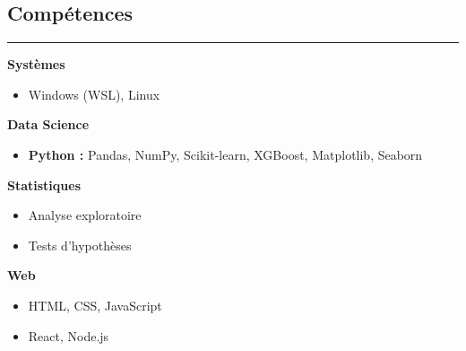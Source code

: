 \documentclass[a4paper,12pt]{article}
\newcommand{\sectionrule}[1]{%
\section*{#1}%
\vspace{-1em}%
\noindent\rule{\linewidth}{1pt}%
\vspace{0.5em}%
}
\begin{document}
\begin{paracol}{2}
\begin{rightcolumn}
\begin{minipage}[t][\dimexpr\textheight - 9em\relax][t]{\dimexpr\linewidth - 1.5em\relax}
{  \vspace{0.5em}

\sectionrule{Compétences}
\vspace{-3em}
\setlength{\columnsep}{2em}
\begin{multicols}{2}

\textbf{Systèmes}
\begin{itemize}[leftmargin=1.2em, nosep]
  \item Windows (WSL), Linux
\end{itemize}
\vspace{1em}
\textbf{Data Science}
\begin{itemize}[leftmargin=1.2em, nosep]
  \item \textbf{Python :} Pandas, NumPy, Scikit-learn, XGBoost,
   Matplotlib, Seaborn

\end{itemize}

\vspace{1em}
\textbf{Statistiques}
\begin{itemize}[leftmargin=1.2em, nosep]
  \item Analyse exploratoire
  \item Tests d’hypothèses
\end{itemize}

\vspace{1em}
\textbf{Web}
\begin{itemize}[leftmargin=1.2em, nosep]
  \item HTML, CSS, JavaScript
  \item React, Node.js
\end{itemize}


\end{multicols}}
\end{minipage}
\end{rightcolumn}
\end{paracol}
\end{document}
